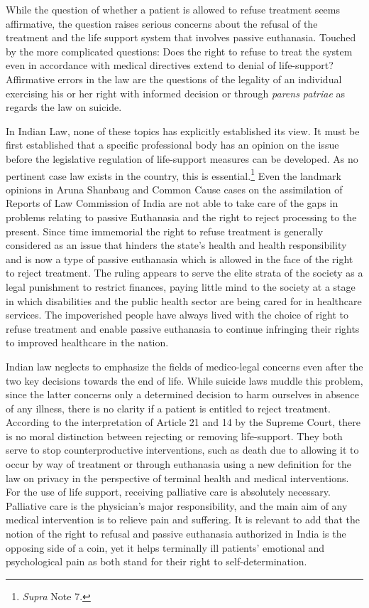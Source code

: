 \begin{multicols}{2}
\noi
While the question of whether a patient is allowed to refuse treatment seems affirmative, the
question raises serious concerns about the refusal of the treatment and the life support system
that involves passive euthanasia. Touched by the more complicated questions: Does the right
to refuse to treat the system even in accordance with medical directives extend to denial of
life-support? Affirmative errors in the law are the questions of the legality of an individual
exercising his or her right with informed decision or through \textit{parens patriae} as regards the
law on suicide.

\noi
In Indian Law, none of these topics has explicitly established its view. It must be first
established that a specific professional body has an opinion on the issue before the legislative
regulation of life-support measures can be developed. As no pertinent case law exists in the
country, this is essential.\footnote{\textit{Supra} Note 7.} Even the landmark opinions in Aruna Shanbaug and Common
Cause cases on the assimilation of Reports of Law Commission of India are not able to take
care of the gaps in problems relating to passive Euthanasia and the right to reject processing
to the present. Since time immemorial the right to refuse treatment is generally considered as
an issue that hinders the state's health and health responsibility and is now a type of passive
euthanasia which is allowed in the face of the right to reject treatment. The ruling appears to
serve the elite strata of the society as a legal punishment to restrict finances, paying little
mind to the society at a stage in which disabilities and the public health sector are being cared
for in healthcare services. The impoverished people have always lived with the choice of
right to refuse treatment and enable passive euthanasia to continue infringing their rights to
improved healthcare in the nation.


\noi
Indian law neglects to emphasize the fields of medico-legal concerns even after the two key
decisions towards the end of life. While suicide laws muddle this problem, since the latter
concerns only a determined decision to harm ourselves in absence of any illness, there is no
clarity if a patient is entitled to reject treatment. According to the interpretation of Article 21
and 14 by the Supreme Court, there is no moral distinction between rejecting or removing
life-support. They both serve to stop counterproductive interventions, such as death due to
allowing it to occur by way of treatment or through euthanasia using a new definition for the
law on privacy in the perspective of terminal health and medical interventions. For the use of 
life support, receiving palliative care is absolutely necessary. Palliative care is the physician’s
major responsibility, and the main aim of any medical intervention is to relieve pain and
suffering. It is relevant to add that the notion of the right to refusal and passive euthanasia
authorized in India is the opposing side of a coin, yet it helps terminally ill patients’
emotional and psychological pain as both stand for their right to self-determination.


\end{multicols}
